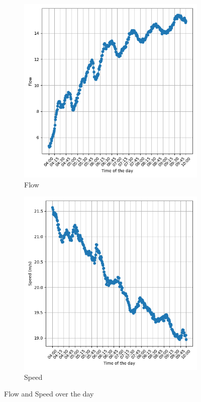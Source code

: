 	
		\begin{figure}[H]
		\centering
		\begin{subfigure}{0.49 \linewidth}
			\includegraphics[width=\textwidth]{../Plots/Flow/avg_flow_day}
			\caption{Flow}
		\end{subfigure}
		\begin{subfigure}{0.49 \linewidth}
			\includegraphics[width=\textwidth]{../Plots/Speed/avg_speed_day}
			\caption{Speed}
		\end{subfigure}
		\caption{Flow and Speed over the day}
		\label{fig:speed_and_flow_overday}
	\end{figure}
